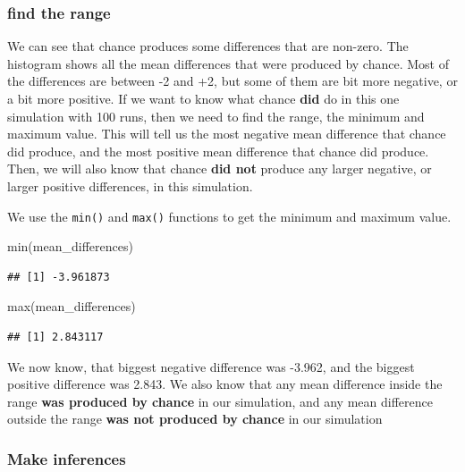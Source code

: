 \documentclass[
]{book}
\newenvironment{Shaded}{\begin{snugshade}}{\end{snugshade}}
\newcommand{\FunctionTok}[1]{\textcolor[rgb]{0.00,0.00,0.00}{#1}}
\newcommand{\NormalTok}[1]{#1}
\begin{document}
\hypertarget{find-the-range}{%
\subsubsection{find the range}\label{find-the-range}}

We can see that chance produces some differences that are non-zero. The histogram shows all the mean differences that were produced by chance. Most of the differences are between -2 and +2, but some of them are bit more negative, or a bit more positive. If we want to know what chance \textbf{did} do in this one simulation with 100 runs, then we need to find the range, the minimum and maximum value. This will tell us the most negative mean difference that chance did produce, and the most positive mean difference that chance did produce. Then, we will also know that chance \textbf{did not} produce any larger negative, or larger positive differences, in this simulation.

We use the \texttt{min()} and \texttt{max()} functions to get the minimum and maximum value.

\begin{Shaded}
\begin{Highlighting}[]
\FunctionTok{min}\NormalTok{(mean\_differences)}
\end{Highlighting}
\end{Shaded}

\begin{verbatim}
## [1] -3.961873
\end{verbatim}

\begin{Shaded}
\begin{Highlighting}[]
\FunctionTok{max}\NormalTok{(mean\_differences)}
\end{Highlighting}
\end{Shaded}

\begin{verbatim}
## [1] 2.843117
\end{verbatim}

We now know, that biggest negative difference was -3.962, and the biggest positive difference was 2.843. We also know that any mean difference inside the range \textbf{was produced by chance} in our simulation, and any mean difference outside the range \textbf{was not produced by chance} in our simulation

\hypertarget{make-inferences}{%
\subsubsection{Make inferences}\label{make-inferences}}
\end{document}
